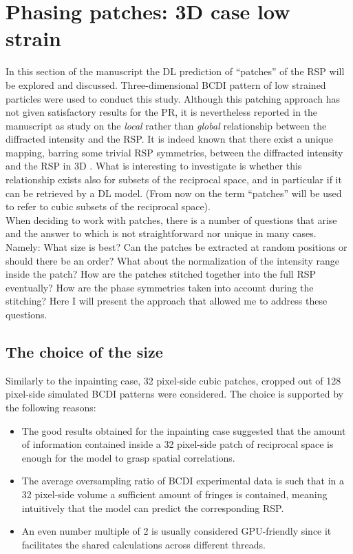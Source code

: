 \section{Phasing patches: 3D case low strain}\label{chp:patches_nostrain}
In this section of the manuscript the DL prediction of ``patches'' of the RSP will be explored and discussed. 
Three-dimensional BCDI pattern of low strained particles were used to conduct this study. 
Although this patching approach has not given satisfactory results for the PR, it is nevertheless reported in the manuscript as 
study on the \textit{local} rather than \textit{global} relationship between the diffracted intensity and the RSP. It is 
indeed known that there exist a unique mapping, barring some trivial RSP symmetries, between the diffracted intensity 
and the RSP in 3D \cite{Miao:98}. What is interesting to investigate is whether this relationship exists also for subsets 
of the reciprocal space, and in particular if it can be retrieved by a DL model. (From now on the term ``patches'' 
will be used to refer to cubic subsets of the reciprocal space). \\

When deciding to work with patches, there is a number of questions that arise and the answer to which is not 
straightforward nor unique in many cases. Namely: What size is best? Can the patches 
be extracted at random positions or should there be an order? What about the normalization of the intensity range inside 
the patch? How are the patches stitched together into the full RSP eventually? How are the phase symmetries taken into account 
during the stitching? 
Here I will present the approach that allowed me to address these questions. 

\subsection{The choice of the size}

Similarly to the inpainting case, 32 pixel-side cubic patches, cropped out of 128 pixel-side simulated
BCDI patterns were considered. The choice is supported by the following reasons: 

\begin{itemize}
    \item The good results obtained for the inpainting case suggested that the amount of information contained inside a
    32 pixel-side patch of reciprocal space is enough for the model to grasp spatial correlations.  
    \item The average oversampling ratio of BCDI experimental data is such that in a 32 pixel-side volume a sufficient
    amount of fringes is contained, meaning intuitively that the model can predict the corresponding RSP. 
    \item An even number multiple of 2 is usually considered GPU-friendly since it facilitates the shared calculations across
    different threads. 
\end{itemize}

